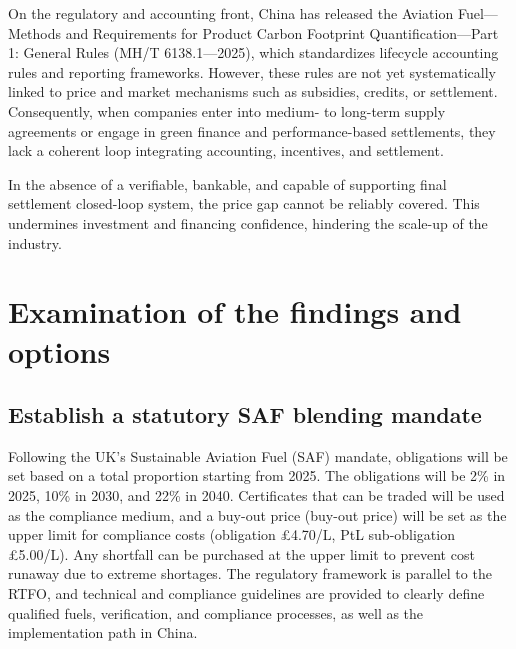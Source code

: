 \documentclass[a4paper,11pt]{article}
\begin{document}
On the regulatory and accounting front, China has released the Aviation Fuel---Methods and Requirements for Product Carbon Footprint Quantification---Part 1: General Rules (MH/T 6138.1---2025), which standardizes lifecycle accounting rules and reporting frameworks. However, these rules are not yet systematically linked to price and market mechanisms such as subsidies, credits, or settlement. Consequently, when companies enter into medium- to long-term supply agreements or engage in green finance and performance-based settlements, they lack a coherent loop integrating accounting, incentives, and settlement.

In the absence of a verifiable, bankable, and capable of supporting final settlement closed-loop system, the price gap cannot be reliably covered. This undermines investment and financing confidence, hindering the scale-up of the industry.


\section{Examination of the findings and options}

\subsection{Establish a statutory SAF blending mandate}
Following the UK's Sustainable Aviation Fuel (SAF) mandate, obligations will be set based on a total proportion starting from 2025. The obligations will be 2\% in 2025, 10\% in 2030, and 22\% in 2040. Certificates that can be traded will be used as the compliance medium, and a buy-out price (buy-out price) will be set as the upper limit for compliance costs (obligation £4.70/L, PtL sub-obligation £5.00/L). Any shortfall can be purchased at the upper limit to prevent cost runaway due to extreme shortages. The regulatory framework is parallel to the RTFO, and technical and compliance guidelines are provided to clearly define qualified fuels, verification, and compliance processes, as well as the implementation path in China.
\end{document}
